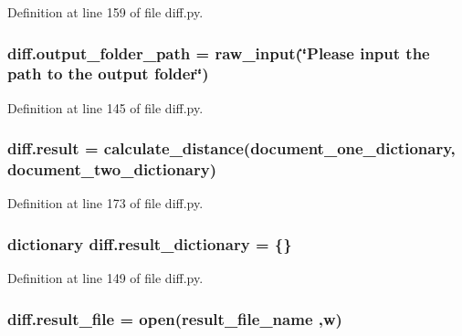 Definition at line 159 of file diff.\+py.

\subsubsection[{\texorpdfstring{output\+\_\+folder\+\_\+path}{output_folder_path}}]{\setlength{\rightskip}{0pt plus 5cm}diff.\+output\+\_\+folder\+\_\+path = raw\+\_\+input(\char`\"{}Please input the path to the output folder\char`\"{})}\hypertarget{namespacediff_aed454348ccff9ceb835a6c22de15fa95}{}\label{namespacediff_aed454348ccff9ceb835a6c22de15fa95}


Definition at line 145 of file diff.\+py.

\subsubsection[{\texorpdfstring{result}{result}}]{\setlength{\rightskip}{0pt plus 5cm}diff.\+result = {\bf calculate\+\_\+distance}({\bf document\+\_\+one\+\_\+dictionary}, {\bf document\+\_\+two\+\_\+dictionary})}\hypertarget{namespacediff_a5df2e8041c6fff30558b49edee35438a}{}\label{namespacediff_a5df2e8041c6fff30558b49edee35438a}


Definition at line 173 of file diff.\+py.

\subsubsection[{\texorpdfstring{result\+\_\+dictionary}{result_dictionary}}]{\setlength{\rightskip}{0pt plus 5cm}dictionary diff.\+result\+\_\+dictionary = \{\}}\hypertarget{namespacediff_a08d29f91abd1bc75aa7d8ecb3aa39c91}{}\label{namespacediff_a08d29f91abd1bc75aa7d8ecb3aa39c91}


Definition at line 149 of file diff.\+py.

\subsubsection[{\texorpdfstring{result\+\_\+file}{result_file}}]{\setlength{\rightskip}{0pt plus 5cm}diff.\+result\+\_\+file = open({\bf result\+\_\+file\+\_\+name} ,\textquotesingle{}w\textquotesingle{})}\hypertarget{namespacediff_aa1be62f435ce37ca93ba61d4ad88c0c9}{}\label{namespacediff_aa1be62f435ce37ca93ba61d4ad88c0c9}


